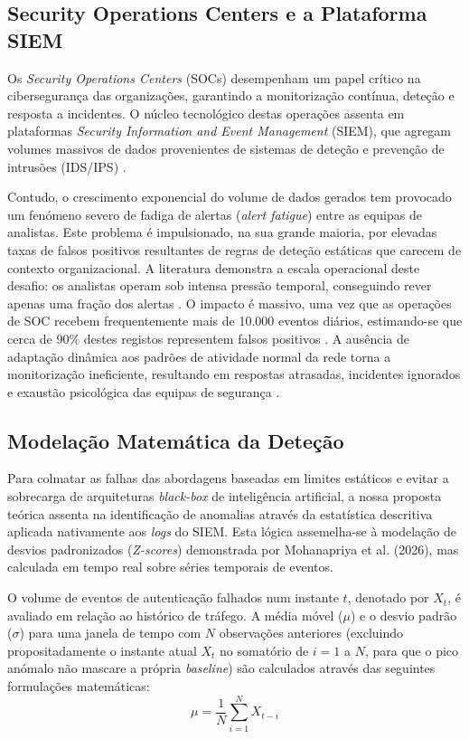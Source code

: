 \documentclass[12pt,a4paper]{article}
\begin{document}
\subsection{Security Operations Centers e a Plataforma SIEM}
Os \textit{Security Operations Centers} (SOCs) desempenham um papel crítico na cibersegurança das organizações, garantindo a monitorização contínua, deteção e resposta a incidentes. O núcleo tecnológico destas operações assenta em plataformas \textit{Security Information and Event Management} (SIEM), que agregam volumes massivos de dados provenientes de sistemas de deteção e prevenção de intrusões (IDS/IPS) \cite{roy2026}. 

Contudo, o crescimento exponencial do volume de dados gerados tem provocado um fenómeno severo de fadiga de alertas (\textit{alert fatigue}) entre as equipas de analistas. Este problema é impulsionado, na sua grande maioria, por elevadas taxas de falsos positivos resultantes de regras de deteção estáticas que carecem de contexto organizacional. A literatura demonstra a escala operacional deste desafio: os analistas operam sob intensa pressão temporal, conseguindo rever apenas uma fração dos alertas \cite{rieger2026, roy2026}. O impacto é massivo, uma vez que as operações de SOC recebem frequentemente mais de 10.000 eventos diários, estimando-se que cerca de 90\% destes registos representem falsos positivos \cite{yauri2026}. A ausência de adaptação dinâmica aos padrões de atividade normal da rede torna a monitorização ineficiente, resultando em respostas atrasadas, incidentes ignorados e exaustão psicológica das equipas de segurança \cite{rieger2026}.

\subsection{Modelação Matemática da Deteção}
Para colmatar as falhas das abordagens baseadas em limites estáticos e evitar a sobrecarga de arquiteturas \textit{black-box} de inteligência artificial, a nossa proposta teórica assenta na identificação de anomalias através da estatística descritiva aplicada nativamente aos \textit{logs} do SIEM. Esta lógica assemelha-se à modelação de desvios padronizados (\textit{Z-scores}) demonstrada por Mohanapriya et al. (2026), mas calculada em tempo real sobre séries temporais de eventos.

O volume de eventos de autenticação falhados num instante $t$, denotado por $X_t$, é avaliado em relação ao histórico de tráfego. A média móvel ($\mu$) e o desvio padrão ($\sigma$) para uma janela de tempo com $N$ observações anteriores (excluindo propositadamente o instante atual $X_t$ no somatório de $i=1$ a $N$, para que o pico anómalo não mascare a própria \textit{baseline}) são calculados através das seguintes formulações matemáticas:
\begin{equation}
    \mu = \frac{1}{N} \sum_{i=1}^{N} X_{t-i}
\end{equation}
\end{document}
